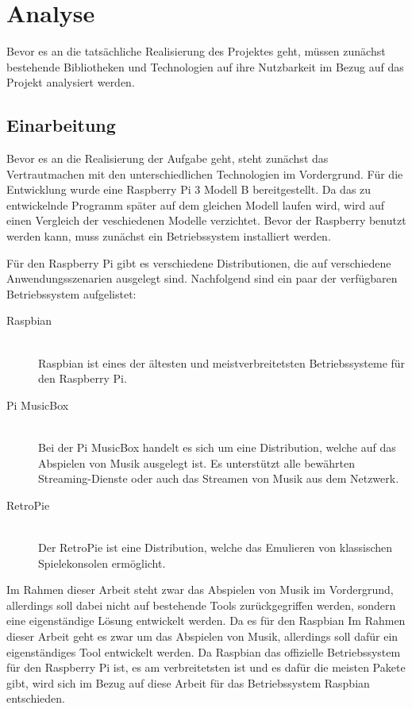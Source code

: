 
\chapter{Analyse}
Bevor es an die tatsächliche Realisierung des Projektes geht, müssen zunächst
bestehende Bibliotheken und Technologien auf ihre Nutzbarkeit im Bezug auf das
Projekt analysiert werden. 


\section{Einarbeitung}
Bevor es an die Realisierung der Aufgabe geht, steht zunächst das
Vertrautmachen mit den unterschiedlichen Technologien im Vordergrund. Für die
Entwicklung wurde eine Raspberry Pi 3 Modell B bereitgestellt. Da das zu
entwickelnde Programm später auf dem gleichen Modell laufen wird, wird auf
einen Vergleich der veschiedenen Modelle verzichtet. Bevor der Raspberry
benutzt werden kann, muss zunächst ein Betriebssystem installiert werden.
\hfill \break

Für den Raspberry Pi gibt es verschiedene Distributionen, die auf verschiedene
Anwendungsszenarien ausgelegt sind. Nachfolgend sind ein paar der verfügbaren
Betriebssystem aufgelistet: 
\begin{description}
\item[Raspbian] \hfill \\ 
    Raspbian ist eines der ältesten und meistverbreitetsten Betriebssysteme für
    den Raspberry Pi. 
\item[Pi MusicBox] \hfill \\ 
    Bei der Pi MusicBox handelt es sich um eine Distribution, welche auf das
    Abspielen von Musik ausgelegt ist. Es unterstützt alle bewährten
    Streaming-Dienste oder auch das Streamen von Musik aus dem Netzwerk.
\item[RetroPie] \hfill \\
    Der RetroPie ist eine Distribution, welche das Emulieren von klassischen
    Spielekonsolen ermöglicht.
\end{description}

Im Rahmen dieser Arbeit steht zwar das Abspielen von Musik im Vordergrund,
allerdings soll dabei nicht auf bestehende Tools zurückgegriffen werden,
sondern eine eigenständige Lösung entwickelt werden. Da es für den Raspbian 
Im Rahmen dieser Arbeit geht es zwar um das Abspielen von Musik, allerdings
soll dafür ein eigenständiges Tool entwickelt werden. Da Raspbian das
offizielle Betriebssystem für den Raspberry Pi ist, es am verbreitetsten ist
und es dafür die meisten Pakete gibt, wird sich im Bezug auf diese Arbeit für
das Betriebssystem Raspbian entschieden.


